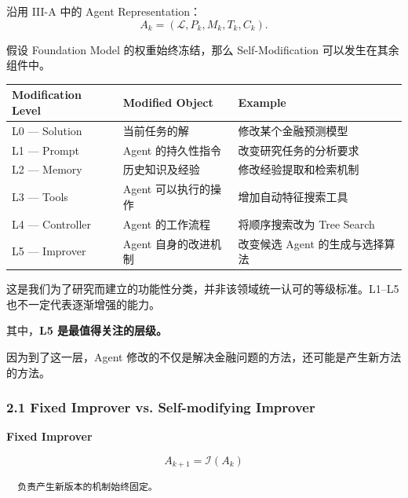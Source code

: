 沿用 III-A 中的 Agent Representation：
\[A_k=(\mathcal L,P_k,M_k,T_k,C_k).\]

假设 Foundation Model 的权重始终冻结，那么 Self-Modification 可以发生在其余组件中。

\begin{readertable}
\begin{longtable}[]{@{}
  >{\raggedright\arraybackslash}p{}
  >{\raggedright\arraybackslash}p{}
  >{\raggedright\arraybackslash}p{}@{}}
\toprule
Modification Level & Modified Object & Example \\
\midrule
\endhead
L0 --- Solution & 当前任务的解 & 修改某个金融预测模型 \\
L1 --- Prompt & Agent 的持久性指令 & 改变研究任务的分析要求 \\
L2 --- Memory & 历史知识及经验 & 修改经验提取和检索机制 \\
L3 --- Tools & Agent 可以执行的操作 & 增加自动特征搜索工具 \\
L4 --- Controller & Agent 的工作流程 & 将顺序搜索改为 Tree Search \\
L5 --- Improver & Agent 自身的改进机制 & 改变候选 Agent 的生成与选择算法 \\
\bottomrule
\end{longtable}
\end{readertable}

这是我们为了研究而建立的功能性分类，并非该领域统一认可的等级标准。L1--L5 也不一定代表逐渐增强的能力。

其中，\textbf{L5 是最值得关注的层级。}

因为到了这一层，Agent 修改的不仅是解决金融问题的方法，还可能是产生新方法的方法。

\hypertarget{part-3-37-0001-fixed-improver-vs.-self-modifying-improver}{%
\subsubsection{2.1 Fixed Improver vs. Self-modifying Improver}\label{part-3-37-0001-fixed-improver-vs.-self-modifying-improver}}

\textbf{Fixed Improver}


\[A_{k+1}=\mathcal I(A_k)\]

\begin{verbatim}
  负责产生新版本的机制始终固定。
\end{verbatim}

